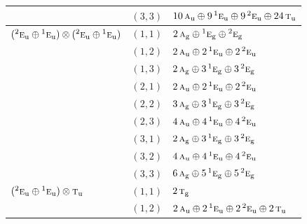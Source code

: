 \documentclass[11pt]{article}
\newcommand{\irr}[1]{\text{\normalfont\scshape #1}}
\newcommand{\conjpair}[1]{{}^{#1}}
\newcommand{\ptag}[1]{\mathrm{#1}}
\begin{document}
\begin{longtable}{p{} c p{}}
 & $(3,3)$ & $10\,\irr{a}_{\ptag{u}}\oplus 9\,\conjpair{1}\irr{e}_{\ptag{u}}\oplus 9\,\conjpair{2}\irr{e}_{\ptag{u}}\oplus 24\,\irr{t}_{\ptag{u}}$\\

\hline

$(\conjpair{2}\irr{e}_{\ptag{u}}\oplus \conjpair{1}\irr{e}_{\ptag{u}})\otimes (\conjpair{2}\irr{e}_{\ptag{u}}\oplus \conjpair{1}\irr{e}_{\ptag{u}})$ & $(1,1)$ & $2\,\irr{a}_{\ptag{g}}\oplus \conjpair{1}\irr{e}_{\ptag{g}}\oplus \conjpair{2}\irr{e}_{\ptag{g}}$\\

 & $(1,2)$ & $2\,\irr{a}_{\ptag{u}}\oplus 2\,\conjpair{1}\irr{e}_{\ptag{u}}\oplus 2\,\conjpair{2}\irr{e}_{\ptag{u}}$\\

 & $(1,3)$ & $2\,\irr{a}_{\ptag{g}}\oplus 3\,\conjpair{1}\irr{e}_{\ptag{g}}\oplus 3\,\conjpair{2}\irr{e}_{\ptag{g}}$\\

 & $(2,1)$ & $2\,\irr{a}_{\ptag{u}}\oplus 2\,\conjpair{1}\irr{e}_{\ptag{u}}\oplus 2\,\conjpair{2}\irr{e}_{\ptag{u}}$\\

 & $(2,2)$ & $3\,\irr{a}_{\ptag{g}}\oplus 3\,\conjpair{1}\irr{e}_{\ptag{g}}\oplus 3\,\conjpair{2}\irr{e}_{\ptag{g}}$\\

 & $(2,3)$ & $4\,\irr{a}_{\ptag{u}}\oplus 4\,\conjpair{1}\irr{e}_{\ptag{u}}\oplus 4\,\conjpair{2}\irr{e}_{\ptag{u}}$\\

 & $(3,1)$ & $2\,\irr{a}_{\ptag{g}}\oplus 3\,\conjpair{1}\irr{e}_{\ptag{g}}\oplus 3\,\conjpair{2}\irr{e}_{\ptag{g}}$\\

 & $(3,2)$ & $4\,\irr{a}_{\ptag{u}}\oplus 4\,\conjpair{1}\irr{e}_{\ptag{u}}\oplus 4\,\conjpair{2}\irr{e}_{\ptag{u}}$\\

 & $(3,3)$ & $6\,\irr{a}_{\ptag{g}}\oplus 5\,\conjpair{1}\irr{e}_{\ptag{g}}\oplus 5\,\conjpair{2}\irr{e}_{\ptag{g}}$\\

\hline

$(\conjpair{2}\irr{e}_{\ptag{u}}\oplus \conjpair{1}\irr{e}_{\ptag{u}})\otimes \irr{t}_{\ptag{u}}$ & $(1,1)$ & $2\,\irr{t}_{\ptag{g}}$\\

 & $(1,2)$ & $2\,\irr{a}_{\ptag{u}}\oplus 2\,\conjpair{1}\irr{e}_{\ptag{u}}\oplus 2\,\conjpair{2}\irr{e}_{\ptag{u}}\oplus 2\,\irr{t}_{\ptag{u}}$\\


\end{longtable}
\end{document}
